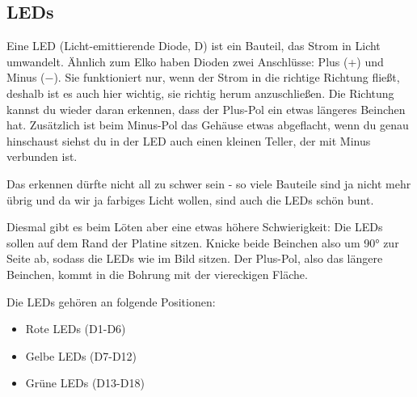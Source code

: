 \documentclass[10pt]{article}
\begin{document}
	\subsection{LEDs}
	\begin{minipage}{0.85\textwidth}
		Eine LED (Licht-emittierende Diode, D) ist ein Bauteil, das Strom in Licht umwandelt. Ähnlich zum Elko haben Dioden zwei Anschlüsse: Plus (+) und Minus (−). Sie funktioniert nur, wenn der Strom in die richtige Richtung fließt, deshalb ist es auch hier wichtig, sie richtig herum anzuschließen. Die Richtung kannst du wieder daran erkennen, dass der Plus-Pol ein etwas längeres Beinchen hat. Zusätzlich ist beim Minus-Pol das Gehäuse etwas abgeflacht, wenn du genau hinschaust siehst du in der LED auch einen kleinen Teller, der mit Minus verbunden ist.
	
		Das erkennen dürfte nicht all zu schwer sein - so viele Bauteile sind ja nicht mehr übrig und da wir ja farbiges Licht wollen, sind auch die LEDs schön bunt.
		
		Diesmal gibt es beim Löten aber eine etwas höhere Schwierigkeit: Die LEDs sollen auf dem Rand der Platine sitzen. Knicke beide Beinchen also um 90° zur Seite ab, sodass die LEDs wie im Bild sitzen. Der Plus-Pol, also das längere Beinchen, kommt in die Bohrung mit der viereckigen Fläche.
		
		Die LEDs gehören an folgende Positionen:
		\begin{itemize}
			\item Rote LEDs (D1-D6)
			\item Gelbe LEDs (D7-D12)
			\item Grüne LEDs (D13-D18)
		\end{itemize}
	\end{minipage}
\end{document}
